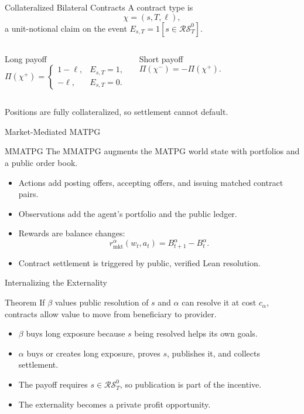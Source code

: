 \documentclass[10pt,aspectratio=169]{beamer}
\newcommand{\RS}{\mathcal{RS}}
\begin{document}
\begin{frame}{Collateralized Bilateral Contracts}
\small
A contract type is
\[
\chi=(s,T,\ell),
\]
a unit-notional claim on the event $E_{s,T}=1[s\in\RS^0_T]$.

\begin{columns}[T,onlytextwidth]
\begin{block}{Long payoff}
\[
\Pi(\chi^+)=
\begin{cases}
1-\ell,& E_{s,T}=1,\\
-\ell,& E_{s,T}=0.
\end{cases}
\]
\end{block}
\begin{block}{Short payoff}
\[
\Pi(\chi^-)=-\Pi(\chi^+).
\]
\end{block}
\end{columns}

\vspace{0.4em}
Positions are fully collateralized, so settlement cannot default.
\end{frame}

\begin{frame}{Market-Mediated MATPG}
\small
\begin{block}{MMATPG}
The MMATPG augments the MATPG world state with portfolios and a public order book.
\end{block}

\begin{itemize}
  \item Actions add posting offers, accepting offers, and issuing matched contract pairs.
  \item Observations add the agent's portfolio and the public ledger.
  \item Rewards are balance changes:
  \[
  r^\alpha_{\mathrm{mkt}}(w_t,a_t)=B^\alpha_{t+1}-B^\alpha_t.
  \]
  \item Contract settlement is triggered by public, verified Lean resolution.
\end{itemize}
\end{frame}

\begin{frame}{Internalizing the Externality}
\small
\begin{block}{Theorem}
If $\beta$ values public resolution of $s$ and $\alpha$ can resolve it at cost $c_\alpha$, contracts allow value to move from beneficiary to provider.
\end{block}

\begin{itemize}
  \item $\beta$ buys long exposure because $s$ being resolved helps its own goals.
  \item $\alpha$ buys or creates long exposure, proves $s$, publishes it, and collects settlement.
  \item The payoff requires $s\in\RS^0_T$, so publication is part of the incentive.
  \item The externality becomes a private profit opportunity.
\end{itemize}
\end{frame}
\end{document}
